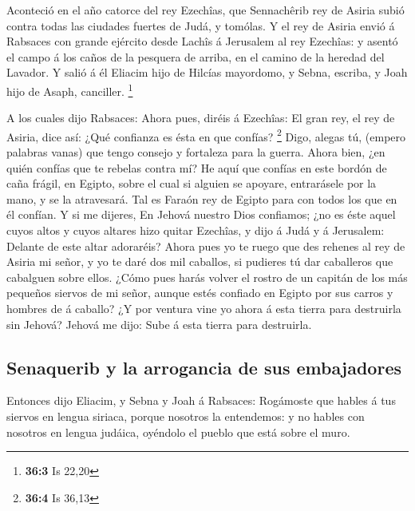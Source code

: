  Aconteció en el año catorce del rey Ezechîas, que
Sennachêrib rey de Asiria subió contra todas las ciudades fuertes de
Judá, y tomólas.  Y el rey de Asiria envió á Rabsaces con
grande ejército desde Lachîs á Jerusalem al rey Ezechîas: y asentó el
campo á los caños de la pesquera de arriba, en el camino de la heredad
del Lavador.  Y salió á él Eliacim hijo de Hilcías
mayordomo, y Sebna, escriba, y Joah hijo de Asaph, canciller.
\footnote{\textbf{36:3} Is 22,20}

 A los cuales dijo Rabsaces: Ahora pues, diréis á Ezechîas:
El gran rey, el rey de Asiria, dice así: ¿Qué confianza es ésta en que
confías? \footnote{\textbf{36:4} Is 36,13}  Digo, alegas tú,
(empero palabras vanas) que tengo consejo y fortaleza para la guerra.
Ahora bien, ¿en quién confías que te rebelas contra mí?  He
aquí que confías en este bordón de caña frágil, en Egipto, sobre el cual
si alguien se apoyare, entrarásele por la mano, y se la atravesará. Tal
es Faraón rey de Egipto para con todos los que en él confían.
 Y si me dijeres, En Jehová nuestro Dios confiamos; ¿no es
éste aquel cuyos altos y cuyos altares hizo quitar Ezechîas, y dijo á
Judá y á Jerusalem: Delante de este altar adoraréis?  Ahora
pues yo te ruego que des rehenes al rey de Asiria mi señor, y yo te daré
dos mil caballos, si pudieres tú dar caballeros que cabalguen sobre
ellos.  ¿Cómo pues harás volver el rostro de un capitán de
los más pequeños siervos de mi señor, aunque estés confiado en Egipto
por sus carros y hombres de á caballo?  ¿Y por ventura vine
yo ahora á esta tierra para destruirla sin Jehová? Jehová me dijo: Sube
á esta tierra para destruirla.

\hypertarget{senaquerib-y-la-arrogancia-de-sus-embajadores}{%
\subsection{Senaquerib y la arrogancia de sus
embajadores}\label{senaquerib-y-la-arrogancia-de-sus-embajadores}}

 Entonces dijo Eliacim, y Sebna y Joah á Rabsaces:
Rogámoste que hables á tus siervos en lengua siriaca, porque nosotros la
entendemos: y no hables con nosotros en lengua judáica, oyéndolo el
pueblo que está sobre el muro.

